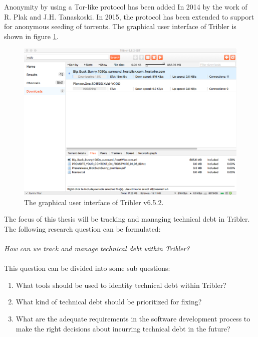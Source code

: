 Anonymity by using a Tor-like protocol has been added In 2014 by the work of R. Plak\cite{plak2014anonymous} and J.H. Tanaskoski\cite{tanaskoski2014anonymous}. 
In 2015, the protocol has been extended to support for anonymous seeding of torrents\cite{ruigrok2015bittorrent}.
The graphical user interface of Tribler is shown in figure \ref{fig:tribler-interface}.

\begin{figure}[!h]
	\centering
	\includegraphics[width=0.9\columnwidth]{images/introduction/tribler_interface}
	\caption{The graphical user interface of Tribler v6.5.2.}
	\label{fig:tribler-interface}
\end{figure}

\newpage

The focus of this thesis will be tracking and managing technical debt in Tribler. The following research question can be formulated:\\\\
\emph{How can we track and manage technical debt within Tribler?}\\\\
This question can be divided into some sub questions:
\begin{enumerate}
	\item What tools should be used to identity technical debt within Tribler?
	\item What kind of technical debt should be prioritized for fixing?
	\item What are the adequate requirements in the software development process to make the right decisions about incurring technical debt in the future?
\end{enumerate}

